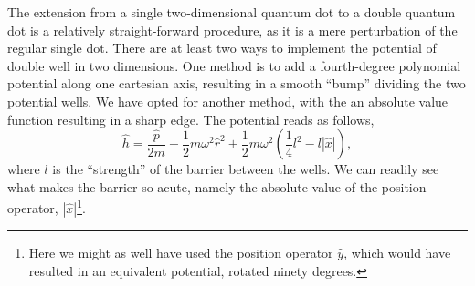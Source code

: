 The extension from a single two-dimensional quantum dot to a double 
quantum dot is a relatively straight-forward procedure, as it is 
a mere perturbation of the regular single dot. There are at least two ways to
implement the potential of double well in two dimensions. One method 
is to add a fourth-degree polynomial potential along one cartesian axis, resulting 
in a smooth ``bump'' dividing the two potential wells. We have opted for another 
method, with the an absolute value function resulting in a sharp edge. The 
potential reads as follows,
\begin{equation}
    \label{eq:sharp_double_well_one_body}
    \hat{h} = \frac{\hat{p}}{2m} + \frac{1}{2}m \omega^2 \hat{r}^2
        + \frac{1}{2}m\omega^2\left(\frac{1}{4}l^2 - l |\hat{x}| \right),
\end{equation}
where $l$ is the ``strength'' of the barrier between the wells. We 
can readily see what makes the barrier so acute, namely the absolute 
value of the position operator, $|\hat{x}|$\footnote{Here we might as 
well have used the position operator $\hat{y}$, which would have resulted 
in an equivalent potential, rotated ninety degrees.}.

\begin{figure}[h]

\end{figure}

